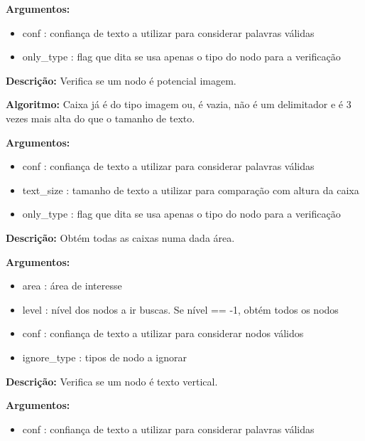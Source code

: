 \textbf{Argumentos:}
\begin{itemize}\setlength\itemsep{-0.3em}
	\vspace{-0.5em}
	\item conf : confiança de texto a utilizar para considerar palavras válidas
	\item only\_type : flag que dita se usa apenas o tipo do nodo para a verificação
\end{itemize}

	

\textbf{Descrição:} Verifica se um nodo é potencial imagem.
	
\textbf{Algoritmo:} Caixa já é do tipo imagem ou, é vazia, não é um delimitador e é 3 vezes mais alta do que o tamanho de texto.


\textbf{Argumentos:}
\begin{itemize}\setlength\itemsep{-0.3em}
	\vspace{-0.5em}
	\item conf : confiança de texto a utilizar para considerar palavras válidas
	\item text\_size : tamanho de texto a utilizar para comparação com altura da caixa
	\item only\_type : flag que dita se usa apenas o tipo do nodo para a verificação
\end{itemize}



\textbf{Descrição:} Obtém todas as caixas numa dada área.


\textbf{Argumentos:}
\begin{itemize}\setlength\itemsep{-0.3em}
	\vspace{-0.5em}
	\item area : área de interesse
	\item level : nível dos nodos a ir buscas. Se nível == -1, obtém todos os nodos
	\item conf : confiança de texto a utilizar para considerar nodos válidos
	\item ignore\_type : tipos de nodo a ignorar
\end{itemize}
	
	

\textbf{Descrição:} Verifica se um nodo é texto vertical.

\textbf{Argumentos:}
\begin{itemize}\setlength\itemsep{-0.3em}
	\vspace{-0.5em}
	\item conf : confiança de texto a utilizar para considerar palavras válidas
\end{itemize}
	
